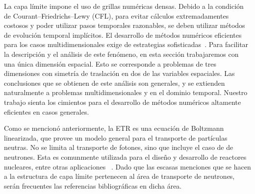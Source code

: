 La capa límite impone el uso de grillas numéricas densas. 
Debido a la condición de Courant--Friedrichs--Lewy (CFL), para evitar cálculos 
extremadamentes costosos y poder utilizar pasos temporales razonables, 
se deben utilizar métodos de evolución temporal implícitos. 
El desarrollo 
de métodos numéricos eficientes para los casos 
multidimensionales exige de estrategias sofisticadas~\cite{Bruno2019}. 
Para facilitar la descripción y el análisis 
de este fenómeno, en esta sección trabajaremos con una única dimensión espacial. 
Esto se corresponde a problemas de tres dimensiones con simetría de traslación en dos 
de las variables espaciales. 
Las conclusiones que se obtienen 
de este análisis son generales, y se extienden naturalmente a problemas multidimensionales 
y en el dominio temporal. Nuestro trabajo 
sienta los cimientos para el desarrollo de métodos numéricos 
altamente eficientes en casos generales.

Como se mencionó anteriormente, la ETR es una ecuación de Boltzmann linearizada, 
que provee un modelo general para el transporte de partículas neutras. 
No se limita al transporte de fotones, sino que incluye el caso de 
de neutrones. Esta es comunmente utilizada 
para el diseño y desarrollo de reactores nucleares, entre otras aplicaciones~
\cite{Chandrasekhar1960,Case1967,Lewis1984,Petrovic1996,Hunter2015,Barichello2016,Hu2020}.  
Dado que las escasas menciones que se hacen a la estructura de capa límite 
pertenecen al área de transporte de neutrones, serán frecuentes las referencias 
bibliográficas en dicha área.

